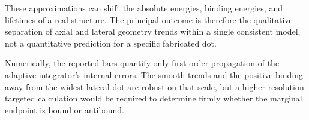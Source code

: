 These approximations can shift the absolute energies, binding energies, and
lifetimes of a real structure. The principal outcome is therefore the
qualitative separation of axial and lateral geometry trends within a single
consistent model, not a quantitative prediction for a specific fabricated
dot.

Numerically, the reported bars quantify only first-order propagation of the
adaptive integrator's internal errors. The smooth trends and the positive
binding away from the widest lateral dot are robust on that scale, but a
higher-resolution targeted calculation would be required to determine firmly
whether the marginal endpoint is bound or antibound.

\FloatBarrier
